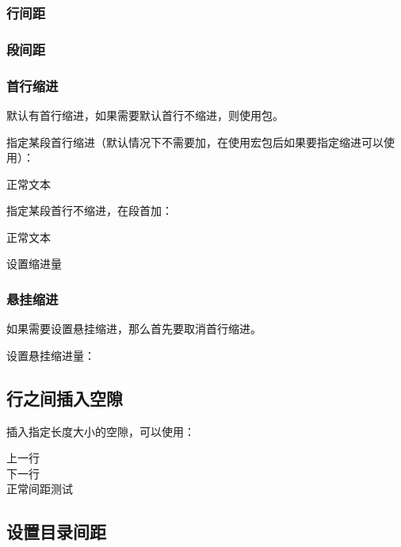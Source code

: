 \subsubsection{行间距}
\begin{texcode}
    \linespread{1.3}%
\end{texcode}

\subsubsection{段间距}
\begin{texcode}
    \setlength{\parskip}{0.5em}
\end{texcode}

\subsubsection{首行缩进}
默认有首行缩进，如果需要默认首行不缩进，则使用包。

指定某段首行缩进（默认情况下不需要加，在使用宏包后如果要指定缩进可以使用）：
\begin{texcode}
    \indent 正常文本
\end{texcode}

指定某段首行不缩进，在段首加：
\begin{texcode}
    \noindent 正常文本
\end{texcode}

设置缩进量
\begin{texcode}
    \setlength\parindent{2em}
\end{texcode}

\subsubsection{悬挂缩进}

如果需要设置悬挂缩进，那么首先要取消首行缩进。
\begin{texcode}
    \noindent{} %
\end{texcode}

设置悬挂缩进量：
\begin{texcode}
    \setlength{\hangindent}{2em}
\end{texcode}

\subsection{行之间插入空隙}
插入指定长度大小的空隙，可以使用：
\begin{texshow}
    上一行\vspace{1cm}\\
    下一行\\
    正常间距测试
\end{texshow}

\subsection{设置目录间距}
\begin{texcode}
    \renewcommand{\baselinestretch}{0.75}\normalsize 
    \tableofcontents
    \renewcommand{\baselinestretch}{1.3}\normalsize %
\end{texcode}

